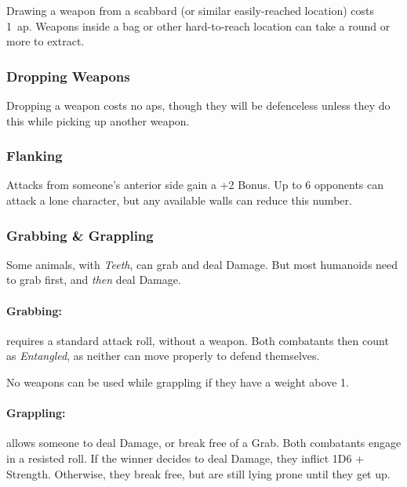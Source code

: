 \begin{multicols}{2}
Drawing a weapon from a scabbard (or similar easily-reached location) costs 1~\gls{ap}.
Weapons inside a bag or other hard-to-reach location can take a round or more to extract.

\subsubsection[Dropping Weapon -- Cost: 0 \gls{ap}]{Dropping Weapons}

Dropping a weapon costs no \glspl{ap}, though they will be defenceless unless they do this while picking up another weapon.


\subsubsection[Flanking: Gain +2 to attack]{Flanking}\label{flank}

Attacks from someone's anterior side gain a +2 Bonus.
Up to 6 opponents can attack a lone character, but any available walls can reduce this number.

\subsubsection{Grabbing \& Grappling}
\label{grappling}
Some animals, with \textit{Teeth}, can grab and deal Damage.
But most humanoids need to grab first, and \emph{then} deal Damage.

\paragraph[Grabs: Make an attack without any weapon bonus. Both combatants are \textit{Entangled}. Cost: 1 \gls{ap}]{Grabbing:}
requires a standard attack roll, without a weapon.
Both combatants then count as \textit{Entangled}, as neither can move properly to defend themselves.
\label{grab}

No weapons can be used while grappling if they have a \gls{weight} above 1.

\paragraph[Grapple: Make an opposted roll of Strength + Combat.  Success means the combatant can either break free or inflict Damage.  Cost: 3~\gls{ap}]{Grappling:}
allows someone to deal Damage, or break free of a Grab.
Both combatants engage in a resisted  roll.
If the winner decides to deal Damage, they inflict 1D6 + Strength.
Otherwise, they break free, but are still lying prone until they get up.
\label{grapple}


\end{multicols}

